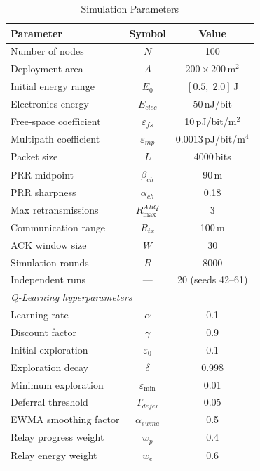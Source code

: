 \documentclass[12pt]{article}
\begin{document}
\begin{table}[!t]
\renewcommand{\arraystretch}{1.2}
\caption{Simulation Parameters}
\label{tab:params}
\centering
\begin{tabular}{lcc}
\hline
\textbf{Parameter} & \textbf{Symbol} & \textbf{Value} \\
\hline
Number of nodes        & $N$                & 100 \\
Deployment area        & $A$                & $200 \times 200$\,m$^2$ \\
Initial energy range   & $E_0$              & $[0.5,\; 2.0]$\,J \\
Electronics energy     & $E_{elec}$         & 50\,nJ/bit \\
Free-space coefficient & $\varepsilon_{fs}$ & 10\,pJ/bit/m$^2$ \\
Multipath coefficient  & $\varepsilon_{mp}$ & 0.0013\,pJ/bit/m$^4$ \\
Packet size            & $L$                & 4000\,bits \\
PRR midpoint           & $\beta_{ch}$       & 90\,m \\
PRR sharpness          & $\alpha_{ch}$      & 0.18 \\
Max retransmissions    & $R_{\max}^{ARQ}$   & 3 \\
Communication range    & $R_{tx}$           & 100\,m \\
ACK window size        & $W$                & 30 \\
Simulation rounds      & $R$                & 8000 \\
Independent runs       & ---                & 20 (seeds 42--61) \\
\hline
\multicolumn{3}{l}{\textit{Q-Learning hyperparameters}} \\
\hline
Learning rate          & $\alpha$           & 0.1 \\
Discount factor        & $\gamma$           & 0.9 \\
Initial exploration    & $\varepsilon_0$    & 0.1 \\
Exploration decay      & $\delta$           & 0.998 \\
Minimum exploration    & $\varepsilon_{\min}$ & 0.01 \\
Deferral threshold     & $T_{defer}$        & 0.05 \\
EWMA smoothing factor  & $\alpha_{ewma}$    & 0.5 \\
Relay progress weight  & $w_p$              & 0.4 \\
Relay energy weight    & $w_e$              & 0.6 \\
\hline
\end{tabular}
\end{table}
\end{document}
